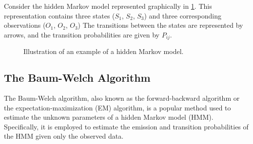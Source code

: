 \documentclass[a4paper,11pt]{article}
\begin{document}
Consider the hidden Markov model represented graphically in \ref{HMM-Graph}. This representation
contains three states ($S_1$, $S_2$, $S_3$) and three corresponding observations ($O_1$, $O_2$, $O_3$)
The transitions between the states are represented by arrows, and the transition probabilities
are given by $P_{ij}$.
\begin{figure}[h]
    \label{HMM-Graph}
    \centering
    

    \caption{Illustration of an example of a hidden Markov model.}
\end{figure}

\subsection{The Baum-Welch Algorithm}
\label{sec:baum-welch}

The Baum-Welch algorithm, also known as the forward-backward algorithm or the expectation-maximization 
(EM) algorithm, is a popular method used to estimate the unknown parameters of a hidden Markov model (HMM). 
Specifically, it is employed to estimate the emission and transition probabilities of the HMM given only 
the observed data.
\end{document}

